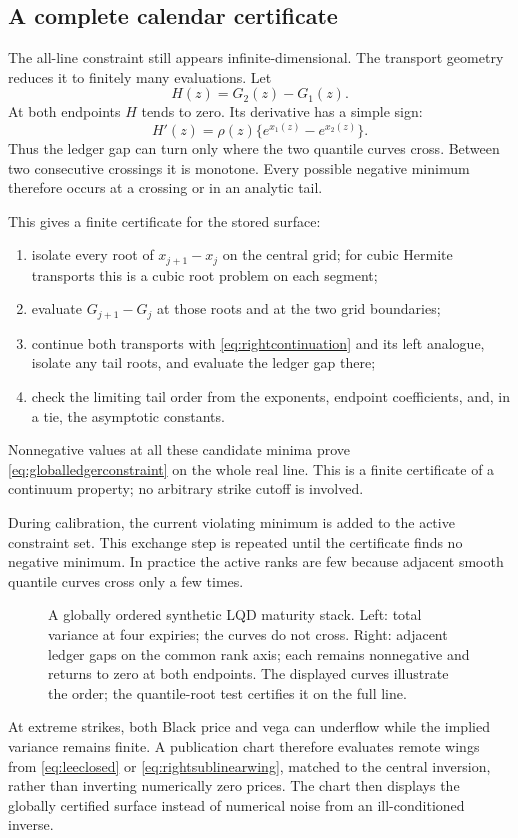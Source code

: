 \subsection{A complete calendar certificate}
\label{sec:calendarcertificate}

The all-line constraint still appears infinite-dimensional.  The transport
geometry reduces it to finitely many evaluations.  Let
\[
H(z)=G_2(z)-G_1(z).
\]
At both endpoints $H$ tends to zero.  Its derivative has a simple sign:
\begin{equation}
H'(z)=\rho(z)\{e^{x_1(z)}-e^{x_2(z)}\}.
\label{eq:calgapderivative}
\end{equation}
Thus the ledger gap can turn only where the two quantile curves cross.  Between
two consecutive crossings it is monotone.  Every possible negative minimum
therefore occurs at a crossing or in an analytic tail.

This gives a finite certificate for the stored surface:
\begin{enumerate}
\item isolate every root of $x_{j+1}-x_j$ on the central grid; for cubic
Hermite transports this is a cubic root problem on each segment;
\item evaluate $G_{j+1}-G_j$ at those roots and at the two grid boundaries;
\item continue both transports with \eqref{eq:rightcontinuation} and its left
analogue, isolate any tail roots, and evaluate the ledger gap there;
\item check the limiting tail order from the exponents, endpoint coefficients,
and, in a tie, the asymptotic constants.
\end{enumerate}
Nonnegative values at all these candidate minima prove
\eqref{eq:globalledgerconstraint} on the whole real line.  This is a finite
certificate of a continuum property; no arbitrary strike cutoff is involved.

During calibration, the current violating minimum is added to the active
constraint set.  This exchange step is repeated until the certificate finds
no negative minimum.  In practice the active ranks are few because adjacent
smooth quantile curves cross only a few times.

\begin{figure}[htbp]
\centering
{}
\caption{A globally ordered synthetic LQD maturity stack.  Left: total
variance at four expiries; the curves do not cross.  Right: adjacent ledger
gaps on the common rank axis; each remains nonnegative and returns to zero at
both endpoints.  The displayed curves illustrate the order; the quantile-root
test certifies it on the full line.}
\label{fig:calendarglobal}
\end{figure}

At extreme strikes, both Black price and vega can underflow while the implied
variance remains finite.  A publication chart therefore evaluates remote
wings from \eqref{eq:leeclosed} or \eqref{eq:rightsublinearwing}, matched to
the central inversion, rather than inverting numerically zero prices.  The
chart then displays the globally certified surface instead of numerical noise
from an ill-conditioned inverse.
